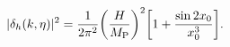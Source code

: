 \begin{equation}
|\delta_{h}(k,\eta)|^2 = \frac{1}{2 \pi^2} \biggl(\frac{H}{M_{\rm P}}\biggr)^2 
\biggl[ 1 + \frac{\sin{2 x_0}}{x_0^3}\biggr].
\label{psd3a}
\end{equation}

